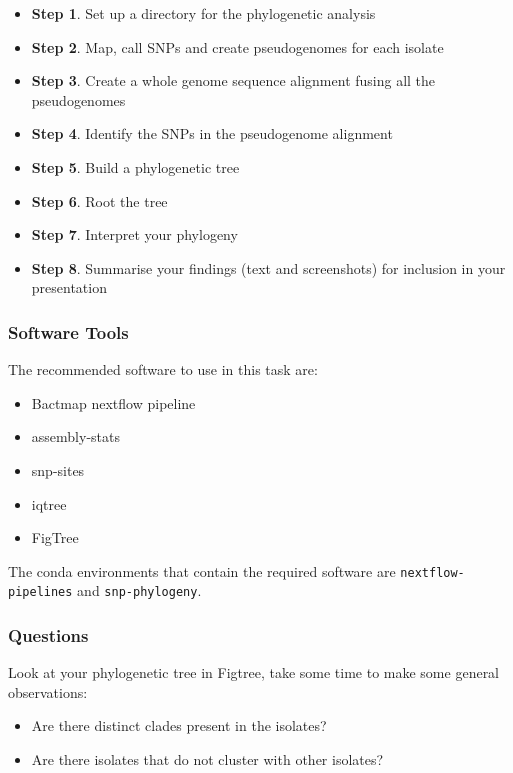\documentclass[11pt]{article}
\providecommand{\tightlist}{%
      \setlength{\itemsep}{0pt}\setlength{\parskip}{0pt}}
\begin{document}
\begin{itemize}
\tightlist
\item
  \textbf{Step 1}. Set up a directory for the phylogenetic analysis
\item
  \textbf{Step 2}. Map, call SNPs and create pseudogenomes for each
  isolate
\item
  \textbf{Step 3}. Create a whole genome sequence alignment fusing all
  the pseudogenomes
\item
  \textbf{Step 4}. Identify the SNPs in the pseudogenome alignment
\item
  \textbf{Step 5}. Build a phylogenetic tree
\item
  \textbf{Step 6}. Root the tree
\item
  \textbf{Step 7}. Interpret your phylogeny
\item
  \textbf{Step 8}. Summarise your findings (text and screenshots) for
  inclusion in your presentation
\end{itemize}

    \hypertarget{software-tools}{%
\subsubsection{Software Tools}\label{software-tools}}

The recommended software to use in this task are:

\begin{itemize}
\tightlist
\item
  Bactmap nextflow pipeline
\item
  assembly-stats
\item
  snp-sites
\item
  iqtree
\item
  FigTree
\end{itemize}

The conda environments that contain the required software are
\texttt{nextflow-pipelines} and \texttt{snp-phylogeny}.

\hypertarget{questions}{%
\subsubsection{Questions}\label{questions}}

Look at your phylogenetic tree in Figtree, take some time to make some
general observations:

\begin{itemize}
\tightlist
\item
  Are there distinct clades present in the isolates?
\item
  Are there isolates that do not cluster with other isolates?
\end{itemize}
\end{document}

